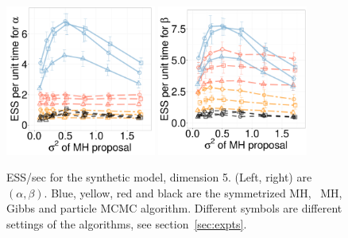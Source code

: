 \vspace{-.4in}
  \begin{figure}[H]
  \centering
  \begin{minipage}[h!]{0.65\linewidth}
  \centering
    \includegraphics [width=0.44\textwidth, angle=0]{figs/new_whole_exp_figs/exp_alpha_dim5.pdf}
    \includegraphics [width=0.44\textwidth, angle=0]{figs/new_whole_exp_figs/exp_beta_dim5.pdf}
  \end{minipage}
  \begin{minipage}[!hp]{0.33\linewidth}
    \caption{ESS/sec for the synthetic  model, dimension 5. (Left, right) 
      are $(\alpha, \beta)$. Blue, yellow, red and black are the symmetrized MH,
  \naive\ MH, Gibbs and particle MCMC algorithm. Different symbols are
different settings of the algorithms, see section~\ref{sec:expts}.}
     \label{fig:ESS_EXP_D55}
  \end{minipage}
  \end{figure}
\vspace{-.4in}
\vspace{-.4in}
